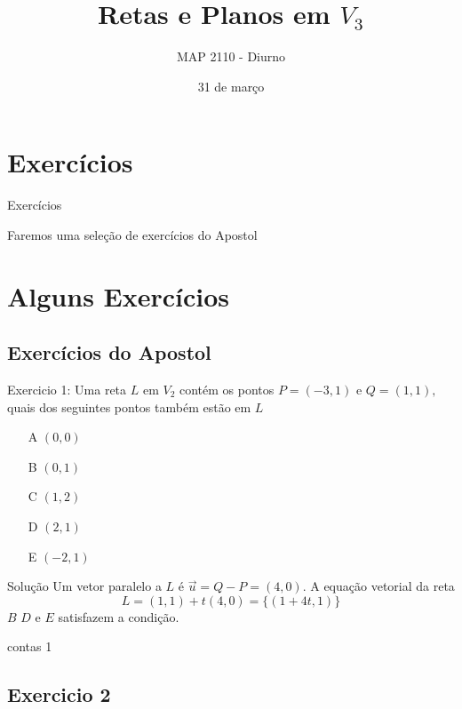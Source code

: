 \documentclass{beamer}
\title[Retas e Planos]{Retas e Planos em $V_3$}
\author{MAP 2110 - Diurno}
\institute{IME USP}
\date{31 de março}
\begin{document}
\begin{frame}
  \titlepage
\end{frame}


\section {Exercícios}

\begin{frame}{Exercícios}
 
 Faremos uma seleção de exercícios do Apostol

\end{frame}

\section{Alguns Exercícios}

\subsection{Exercícios do Apostol}

\begin{frame}{Exercicio 1:}
Uma reta $L$ em $V_2$ contém os pontos $P=(-3,1)$ e $Q=(1,1),$ quais dos seguintes pontos também estão em $L$
\begin{itemize}
   \item[A]$(0,0)$
   \item[B]$(0,1)$
   \item[C]$(1,2)$
   \item[D]$(2,1)$
   \item[E]$(-2,1)$
\end{itemize}
\end{frame}
\begin{frame}{Solução}
  Um vetor paralelo a $L$ é $\vec{u}=Q-P=(4,0)$.
  A equação vetorial da reta 
  $$L=(1,1)+t(4,0)= \{(1+4t,1)\}$$
  $B$ $D$ e $E$ satisfazem a condição.
\end{frame}

\begin{frame}{contas 1}
  
\end{frame}

\subsection{Exercicio 2}
\end{document}

